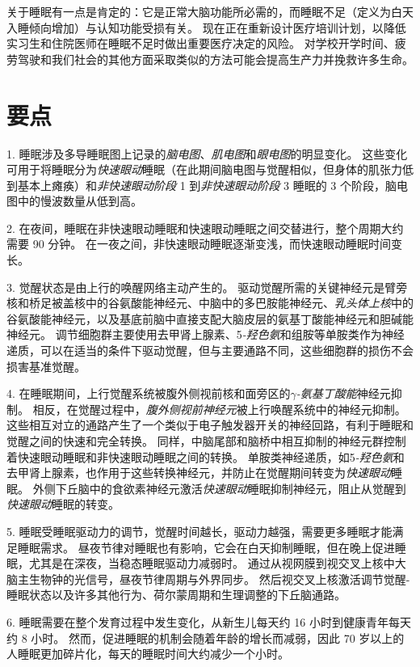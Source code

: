 关于睡眠有一点是肯定的：它是正常大脑功能所必需的，而睡眠不足（定义为白天入睡倾向增加）与认知功能受损有关。
现在正在重新设计医疗培训计划，以降低实习生和住院医师在睡眠不足时做出重要医疗决定的风险。
对学校开学时间、疲劳驾驶和我们社会的其他方面采取类似的方法可能会提高生产力并挽救许多生命。



\section{要点}

1. 睡眠涉及多导睡眠图上记录的\textit{脑电图}、\textit{肌电图}和\textit{眼电图}的明显变化。
这些变化可用于将睡眠分为\textit{快速眼动}睡眠（在此期间脑电图与觉醒相似，但身体的肌张力低到基本上瘫痪）和\textit{非快速眼动阶段} 1 到\textit{非快速眼动阶段} 3 睡眠的 3 个阶段，脑电图中的慢波数量从低到高。


2. 在夜间，睡眠在非快速眼动睡眠和快速眼动睡眠之间交替进行，整个周期大约需要 90 分钟。
在一夜之间，非快速眼动睡眠逐渐变浅，而快速眼动睡眠时间变长。


3. 觉醒状态是由上行的唤醒网络主动产生的。
驱动觉醒所需的关键神经元是臂旁核和桥足被盖核中的谷氨酸能神经元、中脑中的多巴胺能神经元、\textit{乳头体上核}中的谷氨酸能神经元，以及基底前脑中直接支配大脑皮层的氨基丁酸能神经元和胆碱能神经元。
调节细胞群主要使用去甲肾上腺素、5\textit{-羟色氨}和组胺等单胺类作为神经递质，可以在适当的条件下驱动觉醒，但与主要通路不同，这些细胞群的损伤不会损害基准觉醒。 


4. 在睡眠期间，上行觉醒系统被腹外侧视前核和面旁区的\textit{$\gamma$-氨基丁酸能}神经元抑制。
相反，在觉醒过程中，\textit{腹外侧视前神经元}被上行唤醒系统中的神经元抑制。
这些相互对立的通路产生了一个类似于电子触发器开关的神经回路，有利于睡眠和觉醒之间的快速和完全转换。
同样，中脑尾部和脑桥中相互抑制的神经元群控制着快速眼动睡眠和非快速眼动睡眠之间的转换。
单胺类神经递质，如5\textit{-羟色氨}和去甲肾上腺素，也作用于这些转换神经元，并防止在觉醒期间转变为\textit{快速眼动}睡眠。
外侧下丘脑中的食欲素神经元激活\textit{快速眼动}睡眠抑制神经元，阻止从觉醒到\textit{快速眼动}睡眠的转变。


5. 睡眠受睡眠驱动力的调节，觉醒时间越长，驱动力越强，需要更多睡眠才能满足睡眠需求。
昼夜节律对睡眠也有影响，它会在白天抑制睡眠，但在晚上促进睡眠，尤其是在深夜，当稳态睡眠驱动力减弱时。
通过从视网膜到视交叉上核中大脑主生物钟的光信号，昼夜节律周期与外界同步。
然后视交叉上核激活调节觉醒-睡眠状态以及许多其他行为、荷尔蒙周期和生理调整的下丘脑通路。


6. 睡眠需要在整个发育过程中发生变化，从新生儿每天约 16 小时到健康青年每天约 8 小时。
然而，促进睡眠的机制会随着年龄的增长而减弱，因此 70 岁以上的人睡眠更加碎片化，每天的睡眠时间大约减少一个小时。


